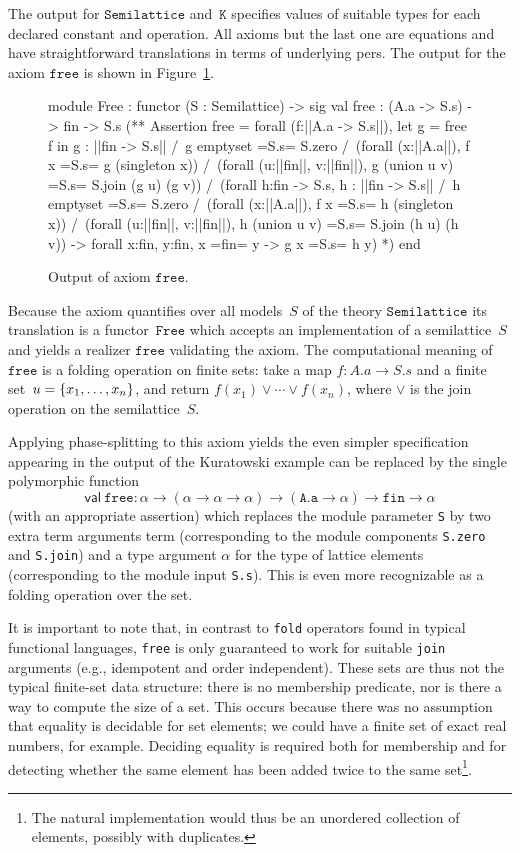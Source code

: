 The output for $\mathtt{Semilattice}$ and~$\mathtt{K}$ specifies
values of suitable types for each declared constant and operation. All
axioms but the last one are equations and have straightforward
translations in terms of underlying pers. The output for the axiom
$\mathtt{free}$ is shown in Figure~\ref{fig:free}.
%
\begin{figure}
  \centering
\begin{source}
module Free : functor (S : Semilattice) ->
sig
val free : (A.a -> S.s) -> fin -> S.s
(**  Assertion free = 
forall (f:||A.a -> S.s||), 
  let g = free f in g : ||fin -> S.s|| /\ 
  g emptyset =S.s= S.zero /\ 
  (forall (x:||A.a||),  f x =S.s= g (singleton x)) /\ 
  (forall (u:||fin||, v:||fin||), g (union u v) =S.s= S.join (g u) (g v)) /\ 
  (forall h:fin -> S.s,  h : ||fin -> S.s|| /\ 
     h emptyset =S.s= S.zero /\ 
     (forall (x:||A.a||), f x =S.s= h (singleton x)) /\ 
     (forall (u:||fin||, v:||fin||), 
        h (union u v) =S.s= S.join (h u) (h v)) ->
     forall x:fin, y:fin,  x =fin= y -> g x =S.s= h y)
*)
end
\end{source}
  \caption{Output of axiom $\texttt{free}$.}
  \label{fig:free}
\end{figure}
%
Because the axiom quantifies over all models~$S$ of the theory
$\mathtt{Semilattice}$ its translation is a functor~$\mathtt{Free}$
which accepts an implementation of a semilattice~$S$ and yields a
realizer $\mathtt{free}$ validating the axiom. The computational
meaning of $\mathtt{free}$ is a folding operation on finite sets: take
a map $f : A.a \to S.s$ and a finite set~$u = \{x_1, \ldots, x_n\}$,
and return $f(x_1) \vee \cdots \vee f(x_n)$, where $\vee$ is the join
operation on the semilattice~$S$.

Applying phase-splitting to this axiom yields the even simpler
specification
appearing in the output of the Kuratowski example can be replaced by the single polymorphic function
\[
\mathsf{val}\ \mathtt{free} : \alpha \to (\alpha \to \alpha \to \alpha) \to (\mathtt{A.a}\to\alpha) \to \mathtt{fin} \to \alpha	
\]
(with an appropriate assertion)
which replaces the module parameter \texttt{S} by two extra term arguments term (corresponding to the module components \texttt{S.zero} and \texttt{S.join}) 
and a type argument $\alpha$ for the type of lattice elements (corresponding to the module input \texttt{S.s}).  This is even
more recognizable as a folding operation over the set.


It is important to note that, in contrast to \texttt{fold} operators found in typical functional
languages, \texttt{free} is only guaranteed to work for suitable \texttt{join} arguments (e.g., idempotent and order independent).  These
sets are thus not the typical finite-set data structure: there is no membership predicate, nor
is there a way to compute the size of a set.  This occurs because there was no
assumption that equality is decidable for set elements; we could have a finite set
of exact real numbers, for example.  Deciding equality
is required both for membership and for detecting
whether the same element has been added twice to the same set\footnote{The natural implementation would thus
be an unordered collection of elements, possibly with duplicates.}.

